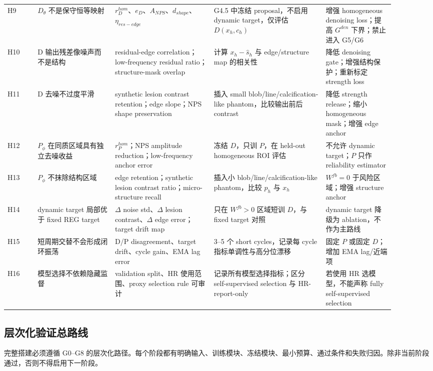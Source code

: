 \documentclass[11pt,a4paper,UTF8,fontset=fandol]{ctexart}
\theoremstyle{definition}
\begin{document}
\begin{longtable}{p{0.07\linewidth}p{0.18\linewidth}p{0.23\linewidth}p{0.26\linewidth}p{0.16\linewidth}}
H9 & $D_\theta$ 不是保守恒等映射 & $r_D^{hom}$、$e_D$、$A_{NPS}$、$d_{shape}$、$\eta_{res-edge}$ & G4.5 中冻结 proposal，不启用 dynamic target，仅评估 $D(x_h,c_h)$ & 增强 homogeneous denoising loss；提高 $G^{den}$ 下界；禁止进入 G5/G6 \\
H10 & D 输出残差像噪声而不是结构 & residual-edge correlation；low-frequency residual ratio；structure-mask overlap & 计算 $x_h-\hat s_h$ 与 edge/structure map 的相关性 & 降低 denoising gate；增强结构保护；重新标定 strength loss \\
H11 & D 去噪不过度平滑 & synthetic lesion contrast retention；edge slope；NPS shape preservation & 插入 small blob/line/calcification-like phantom，比较输出前后 contrast & 降低 strength release；缩小 homogeneous mask；增强 edge anchor \\
H12 & $P_\phi$ 在同质区域具有独立去噪收益 & $r_P^{hom}$；NPS amplitude reduction；low-frequency anchor error & 冻结 $D$，只训 $P$，在 held-out homogeneous ROI 评估 & 不允许 dynamic target；$P$ 只作 reliability estimator \\
H13 & $P_\phi$ 不抹除结构区域 & edge retention；synthetic lesion contrast ratio；micro-structure recall & 插入小 blob/line/calcification-like phantom，比较 $p_h$ 与 $x_h$ & $W^{fb}=0$ 于风险区域；增强 structure anchor \\
H14 & dynamic target 局部优于 fixed REG target & $\Delta$ noise std、$\Delta$ lesion contrast、$\Delta$ edge error；target drift map & 只在 $W^{fb}>0$ 区域短训 $D$，与 fixed target 对照 & dynamic target 降级为 ablation，不作为主路线 \\
H15 & 短周期交替不会形成闭环振荡 & D/P disagreement、target drift、cycle gain、EMA lag error & 3--5 个 short cycles，记录每 cycle 指标单调性与高分位漂移 & 固定 $P$ 或固定 $D$；增加 EMA lag/近端项 \\
H16 & 模型选择不依赖隐藏监督 & validation split、HR 使用范围、proxy selection rule 可审计 & 记录所有模型选择指标；区分 self-supervised selection 与 HR-report-only & 若使用 HR 选模型，不能声称 fully self-supervised selection \\
\bottomrule
\end{longtable}

\subsection{层次化验证总路线}
\label{subsec:hierarchical-validation-route}

完整搭建必须遵循 G0--G8 的层次化路径。每个阶段都有明确输入、训练模块、冻结模块、最小预算、通过条件和失败归因。除非当前阶段通过，否则不得启用下一阶段。
\end{document}
